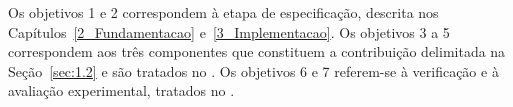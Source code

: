 Os objetivos 1 e 2 correspondem à etapa de especificação, descrita nos Capítulos~\ref{2_Fundamentacao} e~\ref{3_Implementacao}. Os objetivos 3 a 5 correspondem aos três componentes que constituem a contribuição delimitada na Seção~\ref{sec:1.2} e são tratados no . Os objetivos 6 e 7 referem-se à verificação e à avaliação experimental, tratados no .
